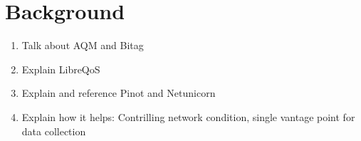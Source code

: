 \section{Background}
\begin{enumerate}
    \item Talk about AQM and Bitag
    \item Explain LibreQoS
    \item Explain and reference Pinot and Netunicorn 
    \item Explain how it helps: Contrilling network condition, single vantage point for data collection
\end{enumerate}